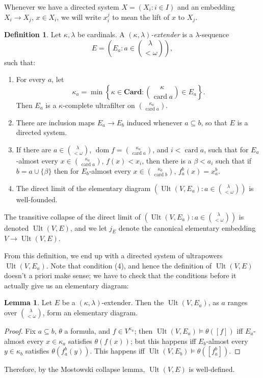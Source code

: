 \documentclass[12pt]{report}
\newcommand{\card}{\operatorname{card}}
\newcommand{\Card}{\mathbf{Card}}
\DeclareMathOperator{\dom}{dom}
\DeclareMathOperator{\Ult}{Ult}
\newcommand{\dfn}[1]{\emph{#1}\index{#1}}
\theoremstyle{definition}
\newtheorem{lemma}[theorem]{Lemma}
\newtheorem{definition}[theorem]{Definition}
\begin{document}
Whenever we have a directed system $X = (X_i: i \in I)$ and an embedding $X_i \to X_j$, $x \in X_i$, we will write $x_i^j$ to mean the lift of $x$ to $X_j$.
\begin{definition}
Let $\kappa,\lambda$ be cardinals. A \dfn{$(\kappa, \lambda)$-extender} is a $\lambda$-sequence
$$E = (E_a: a \in \binom{\lambda}{<\omega}),$$
such that:
\begin{enumerate}
\item For every $a$, let
$$\kappa_a = \min\left\{\kappa \in \Card: \binom{\kappa}{\card a} \in E_a\right\}.$$
Then $E_a$ is a $\kappa$-complete ultrafilter on $\binom{\kappa_a}{\card a}$.
\item There are inclusion maps $E_a \to E_b$ induced whenever $a \subseteq b$, so that $E$ is a directed system.
\item If there are $a \in \binom{\lambda}{<\omega}$, $\dom f = \binom{\kappa_a}{\card a}$, and $i < \card a$, such that for $E_a$-almost every $x \in \binom{\kappa_a}{\card a}$, $f(x) < x_i$,
then there is a $\beta < a_i$ such that if $b = a \cup \{\beta\}$ then for $E_b$-almost every $x \in \binom{\kappa_b}{\card b}$, $f_a^b(x) = x_a^b$.
\item The direct limit of the elementary diagram $(\Ult(V, E_a): a \in \binom{\lambda}{<\omega})$ is well-founded.
\end{enumerate}
The transitive collapse of the direct limit of $(\Ult(V, E_a): a \in \binom{\lambda}{<\omega})$ is denoted $\Ult(V, E)$, and we let $j_E$ denote the canonical elementary embedding $V \to \Ult(V, E)$.
\end{definition}
From this definition, we end up with a directed system of ultrapowers $\Ult(V, E_a)$.
Note that condition (4), and hence the definition of $\Ult(V, E)$ doesn't a priori make sense; we have to check that the conditions before it actually give us an elementary diagram:
\begin{lemma}
Let $E$ be a $(\kappa, \lambda)$-extender. Then the $\Ult(V, E_a)$, as $a$ ranges over $\binom{\lambda}{<\omega}$, form an elementary diagram.
\end{lemma}
\begin{proof}
Fix $a \subseteq b$, $\theta$ a formula, and $f \in V^{\kappa_a}$; then $\Ult(V, E_a) \models \theta([f])$ iff $E_a$-almost every $x \in \kappa_a$ satisfies $\theta(f(x))$; but this happens iff $E_b$-almost every $y \in \kappa_b$ satisfies $\theta(f_a^b(y))$.
This happens iff $\Ult(V, E_b) \models \theta([f_a^b])$.
\end{proof}
Therefore, by the Mostowski collapse lemma, $\Ult(V, E)$ is well-defined.
\end{document}
